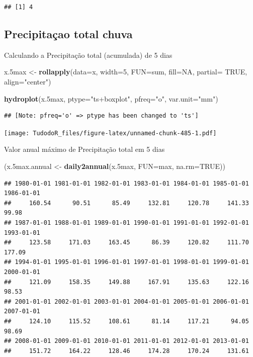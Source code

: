 \documentclass[
]{book}
\newenvironment{Shaded}{\begin{snugshade}}{\end{snugshade}}
\newcommand{\DataTypeTok}[1]{\textcolor[rgb]{0.13,0.29,0.53}{#1}}
\newcommand{\DecValTok}[1]{\textcolor[rgb]{0.00,0.00,0.81}{#1}}
\newcommand{\FloatTok}[1]{\textcolor[rgb]{0.00,0.00,0.81}{#1}}
\newcommand{\KeywordTok}[1]{\textcolor[rgb]{0.13,0.29,0.53}{\textbf{#1}}}
\newcommand{\NormalTok}[1]{#1}
\newcommand{\OtherTok}[1]{\textcolor[rgb]{0.56,0.35,0.01}{#1}}
\newcommand{\StringTok}[1]{\textcolor[rgb]{0.31,0.60,0.02}{#1}}
\begin{document}
\begin{verbatim}
## [1] 4
\end{verbatim}

\hypertarget{precipitauxe7ao-total-chuva}{%
\subsection{Precipitaçao total chuva}\label{precipitauxe7ao-total-chuva}}

Calculando a Precipitação total (acumulada) de 5 dias

\begin{Shaded}
\begin{Highlighting}[]
\NormalTok{x}\FloatTok{.5}\NormalTok{max <-}\StringTok{ }\KeywordTok{rollapply}\NormalTok{(}\DataTypeTok{data=}\NormalTok{x, }\DataTypeTok{width=}\DecValTok{5}\NormalTok{, }\DataTypeTok{FUN=}\NormalTok{sum, }\DataTypeTok{fill=}\OtherTok{NA}\NormalTok{, }\DataTypeTok{partial=} \OtherTok{TRUE}\NormalTok{,}
\DataTypeTok{align=}\StringTok{"center"}\NormalTok{)}

\KeywordTok{hydroplot}\NormalTok{(x}\FloatTok{.5}\NormalTok{max, }\DataTypeTok{ptype=}\StringTok{"ts+boxplot"}\NormalTok{, }\DataTypeTok{pfreq=}\StringTok{"o"}\NormalTok{, }\DataTypeTok{var.unit=}\StringTok{"mm"}\NormalTok{)}
\end{Highlighting}
\end{Shaded}

\begin{verbatim}
## [Note: pfreq='o' => ptype has been changed to 'ts']
\end{verbatim}

\texttt{[image: TudodoR\_files/figure-latex/unnamed-chunk-485-1.pdf]}

Valor anual máximo de Precipitação total em 5 dias

\begin{Shaded}
\begin{Highlighting}[]
\NormalTok{(x}\FloatTok{.5}\NormalTok{max.annual <-}\StringTok{ }\KeywordTok{daily2annual}\NormalTok{(x}\FloatTok{.5}\NormalTok{max, }\DataTypeTok{FUN=}\NormalTok{max, }\DataTypeTok{na.rm=}\OtherTok{TRUE}\NormalTok{))}
\end{Highlighting}
\end{Shaded}

\begin{verbatim}
## 1980-01-01 1981-01-01 1982-01-01 1983-01-01 1984-01-01 1985-01-01 1986-01-01 
##     160.54      90.51      85.49     132.81     120.78     141.33      99.98 
## 1987-01-01 1988-01-01 1989-01-01 1990-01-01 1991-01-01 1992-01-01 1993-01-01 
##     123.58     171.03     163.45      86.39     120.82     111.70     177.09 
## 1994-01-01 1995-01-01 1996-01-01 1997-01-01 1998-01-01 1999-01-01 2000-01-01 
##     121.09     158.35     149.88     167.91     135.63     122.16      98.53 
## 2001-01-01 2002-01-01 2003-01-01 2004-01-01 2005-01-01 2006-01-01 2007-01-01 
##     124.10     115.52     108.61      81.14     117.21      94.05      98.69 
## 2008-01-01 2009-01-01 2010-01-01 2011-01-01 2012-01-01 2013-01-01 
##     151.72     164.22     128.46     174.28     170.24     131.61
\end{verbatim}
\end{document}
